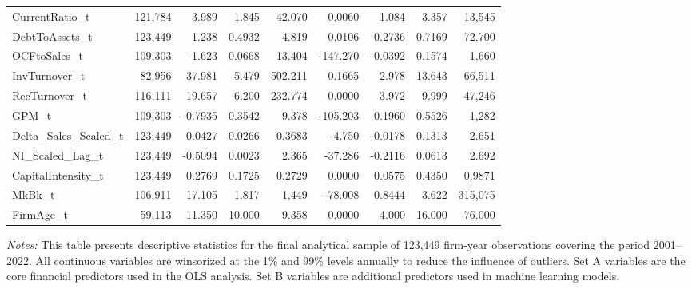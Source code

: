 \begin{table}[htbp]
\begin{adjustbox}{width=\textwidth}
\begin{tabular}{lrrrrrrrr}
CurrentRatio\_t & 121,784 & 3.989 & 1.845 & 42.070 & 0.0060 & 1.084 & 3.357 & 13,545 \\
DebtToAssets\_t & 123,449 & 1.238 & 0.4932 & 4.819 & 0.0106 & 0.2736 & 0.7169 & 72.700 \\
OCFtoSales\_t & 109,303 & -1.623 & 0.0668 & 13.404 & -147.270 & -0.0392 & 0.1574 & 1,660 \\
InvTurnover\_t & 82,956 & 37.981 & 5.479 & 502.211 & 0.1665 & 2.978 & 13.643 & 66,511 \\
RecTurnover\_t & 116,111 & 19.657 & 6.200 & 232.774 & 0.0000 & 3.972 & 9.999 & 47,246 \\
GPM\_t & 109,303 & -0.7935 & 0.3542 & 9.378 & -105.203 & 0.1960 & 0.5526 & 1,282 \\
Delta\_Sales\_Scaled\_t & 123,449 & 0.0427 & 0.0266 & 0.3683 & -4.750 & -0.0178 & 0.1313 & 2.651 \\
NI\_Scaled\_Lag\_t & 123,449 & -0.5094 & 0.0023 & 2.365 & -37.286 & -0.2116 & 0.0613 & 2.692 \\
CapitalIntensity\_t & 123,449 & 0.2769 & 0.1725 & 0.2729 & 0.0000 & 0.0575 & 0.4350 & 0.9871 \\
MkBk\_t & 106,911 & 17.105 & 1.817 & 1,449 & -78.008 & 0.8444 & 3.622 & 315,075 \\
FirmAge\_t & 59,113 & 11.350 & 10.000 & 9.358 & 0.0000 & 4.000 & 16.000 & 76.000 \\
\bottomrule
\end{tabular}
\end{adjustbox}

\begin{tablenotes}
\small
\item \textit{Notes:} This table presents descriptive statistics for the final analytical sample of 123,449 firm-year observations covering the period 2001--2022. All continuous variables are winsorized at the 1\% and 99\% levels annually to reduce the influence of outliers. Set A variables are the core financial predictors used in the OLS analysis. Set B variables are additional predictors used in machine learning models.
\end{tablenotes}
\end{table}